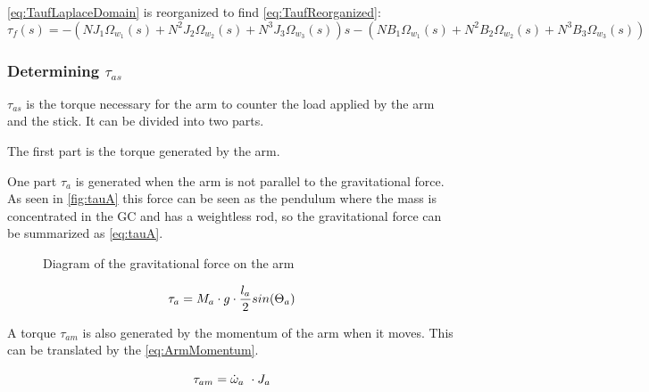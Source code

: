 \autoref{eq:TaufLaplaceDomain} is reorganized to find \autoref{eq:TaufReorganized}:
\begin{equation}
	\tau_f(s) = -(N J_1\Omega_{w_1}(s) + N^2 J_2\Omega_{w_2}(s) + N^3 J_3\Omega_{w_3}(s))s -( N B_1\Omega_{w_1}(s) + N^2 B_2\Omega_{w_2}(s) + N^3 B_3\Omega_{w_3}(s))
	\label{eq:TaufReorganized}
\end{equation}











\subsubsection*{Determining $\tau_{as}$}

$\tau_{as}$ is the torque necessary for the arm to counter the load applied by the arm and the stick. It can be divided into two parts.

The first part is the torque generated by the arm.

 One part $\tau_a$ is generated when the arm is not parallel to the gravitational force. As seen in \autoref{fig:tauA} this force can be seen as the pendulum where the mass is concentrated in the GC and has a weightless rod, so the gravitational force can be summarized as \autoref{eq:tauA}.

\begin{figure}[htbp]
	\caption{Diagram of the gravitational force on the arm}\label{fig:tauA}
\end{figure}

\begin{equation}\label{eq:tauA}
	\tau_a=M_a\cdot g \cdot \frac{l_a}{2} sin(\Theta_a) \addunit{\newton\meter}
\end{equation}
\startexplain
{}
\stopexplain

A torque $\tau_{am}$ is also generated by the momentum of the arm when it moves. This can be translated by the \autoref{eq:ArmMomentum}.

\begin{equation}\label{eq:ArmMomentum}
	\tau_{am}=\dot\omega_a\ \cdot J_a \addunit{\newton\meter}
\end{equation}
\startexplain
{}
\stopexplain

